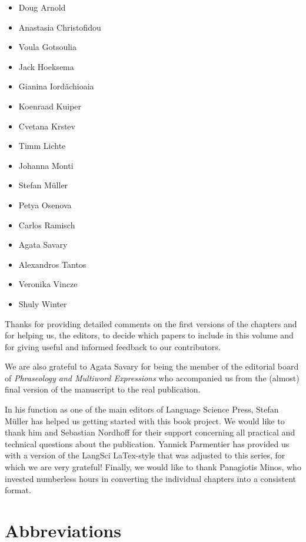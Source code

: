 \documentclass[output=paper]{langsci/langscibook}
\begin{document}
\begin{itemize}
\item Doug Arnold
\item Anastasia Christofidou
\item Voula Gotsoulia
\item Jack Hoeksema
\item Gianina Iord\v{a}chioaia
\item Koenraad Kuiper
\item Cvetana Krstev
\item Timm Lichte
\item Johanna Monti
\item Stefan Müller
\item Petya Osenova
\item Carlos Ramisch
\item Agata Savary
\item Alexandros Tantos
\item Veronika Vincze
\item Shuly Winter
\end{itemize}

Thanks for providing detailed comments on the first versions of the chapters and for helping us, the editors, to decide which papers to include in this volume and for giving useful and informed feedback to our contributors.

We are also grateful to  Agata Savary for being the member of the editorial board of \emph{Phraseology and Multiword Expressions} who accompanied us from the (almost) final version of the manuscript to the real publication.

In his function as one of the main editors of Language Science Press,  Stefan M\"uller has helped us getting started with this book project. We would like to thank him and Sebastian Nordhoff for their support concerning all practical and technical questions about the publication.  Yannick Parmentier has provided us with a version of the LangSci LaTex-style that was adjusted to this series, for which we are very grateful! Finally, we would like to thank  Panagiotis Minos, who invested numberless hours in converting the individual chapters into a consistent format. 

\section*{Abbreviations} 
\end{document}
